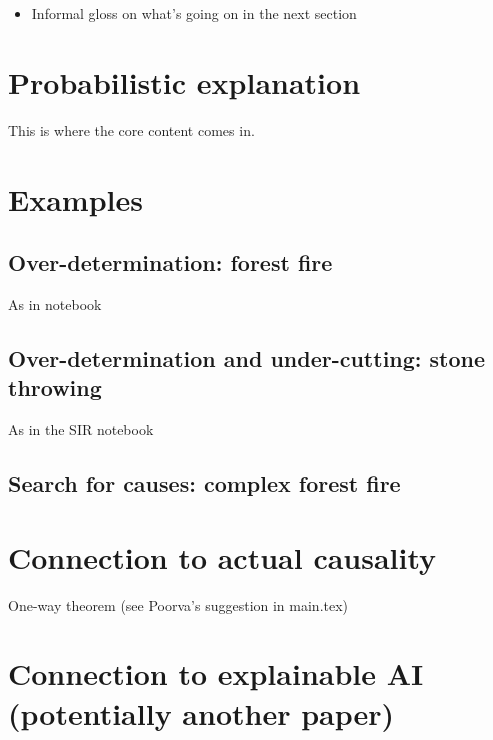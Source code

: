 \documentclass{article}
\begin{document}
\begin{itemize}
\begin{itemize}
\item Going soft on equality and non-equality tavares19predicateExchange

\end{itemize}

\item  Informal gloss on what's going on in the next section

\end{itemize}



\section{Probabilistic explanation}


This is where the core content comes in.


\section{Examples}

\subsection{Over-determination: forest fire}

As in notebook

\subsection{Over-determination and under-cutting: stone throwing}

As in the SIR notebook

\subsection{Search for causes: complex forest fire}



\section{Connection to actual causality}

One-way theorem (see Poorva's suggestion in main.tex)


\section{Connection to explainable AI (potentially another paper)}
\end{document}
